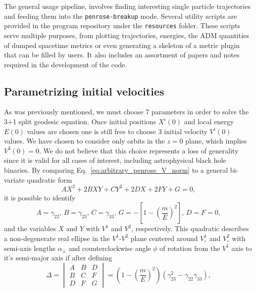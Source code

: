 %
The general usage pipeline, involves finding interesting single particle trajectories and feeding them into the \texttt{penrose-breakup} mode. Several utility scripts are provided in the program repository under the \texttt{resources} folder. These scripts serve multiple purposes, from plotting trajectories, energies, the ADM quantities of dumped spacetime metrics or even generating a skeleton of a metric plugin that can be filled by users. It also includes an assortment of papers and notes required in the development of the code.

\subsection{Parametrizing initial velocities}

As was previously mentioned, we must choose 7 parameters in order to solve the 3+1 split geodesic equation. Once initial positions $X^i(0)$ and local energy $E(0)$ values are chosen one is still free to choose 3 initial velocity $V^i(0)$ values. We have chosen to consider only orbits in the $z=0$ plane, which implies $V^3(0)=0$. We do not believe that this choice represents a loss of generality since it is valid for all cases of interest, including astrophysical black hole binaries. By comparing Eq.~\eqref{eq:arbitrary_penrose_V_norm} to a general bi-variate quadratic form
%
\begin{equation}
  A X^2 + 2 B X Y + C Y^2 + 2 D X + 2 F Y + G = 0,
  \label{eq:arbitrary_penrose_general_quadratic_form}
\end{equation}
%
it is possible to identify
%
\begin{equation}
  A = \gamma_{22},\, B = \gamma_{23},\, C = \gamma_{33},\, G = -\left[ 1 - \left( \frac{m}{E} \right)^2 \right],\, D = F = 0,
\end{equation}
%
and the variables $X$ and $Y$ with $V^1$ and $V^2$, respectively. This quadratic describes a non-degenerate real ellipse in the $V^1$-$V^2$ plane centered around $V^1_\circ$ and $V^2_\circ$ with semi-axis lengths $\alpha_\pm$ and counterclockwise angle $\phi$ of rotation from the $V^1$ axis to it's semi-major axis if after defining~\cite{Hart2002}
%
\begin{equation}
  \Delta = 
  \begin{vmatrix}
    A & B & D  \\
    B & C & F  \\
    D & F & G
  \end{vmatrix}
  = \left( 1 - \left( \frac{m}{E} \right)^2 \right) \left(\gamma_{23}^2-\gamma_{22} \gamma_{33}\right)
  \label{eq:arbitrary_penrose_quadratic_determinant}
  ,
\end{equation}
